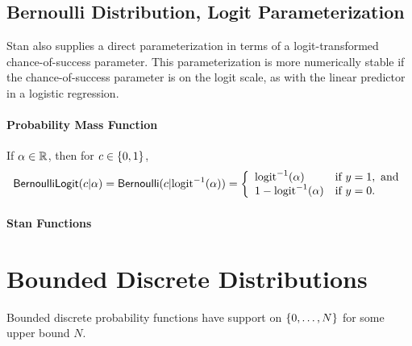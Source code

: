 \section{Bernoulli Distribution, Logit Parameterization}\label{bernoulli-logit-distribution.section}

Stan also supplies a direct parameterization in terms of a
logit-transformed chance-of-success parameter.  This parameterization
is more numerically stable if the chance-of-success parameter is on
the logit scale, as with the linear predictor in a logistic
regression.

\subsubsection{Probability Mass Function}

If $\alpha \in \reals$, then for $c \in \setlist{0,1}$,
\[
\distro{BernoulliLogit}(c|\alpha)
=
\distro{Bernoulli}(c|\mbox{logit}^{-1}(\alpha))
=
\left\{
\begin{array}{ll}
\mbox{logit}^{-1}(\alpha) & \mbox{if } y = 1, \mbox{ and}
\\
1 - \mbox{logit}^{-1}(\alpha) & \mbox{if } y = 0.
\end{array}
\right.
\]


\subsubsection{Stan Functions}

\begin{description}
%
%
\end{description}
%
\begin{description}
\end{description}


\chapter{Bounded Discrete Distributions}\label{betafun.chapter}

\noindent
Bounded discrete probability functions have support on
$\setlist{0,\ldots,N}$ for some upper bound $N$.


